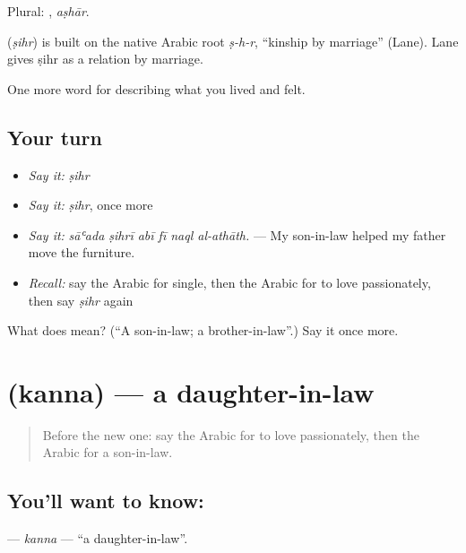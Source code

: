 Plural: , \emph{aṣhār}.

\begin{cousinweb}
\textbf{} (\emph{ṣihr}) is built on the native Arabic root \emph{ṣ-h-r}, \textquotedblleft{}kinship by marriage\textquotedblright{} (Lane). Lane gives ṣihr as a relation by marriage.
\end{cousinweb}

\begin{grammarlens}[title={What you've built}]
One more word for describing what you lived and felt.
\end{grammarlens}

\subsection*{Your turn}
\begin{itemize}
\raggedright
  \item \emph{Say it:} \emph{ṣihr}
  \item \emph{Say it:} \emph{ṣihr}, once more
  \item \emph{Say it:} \emph{sāʿada ṣihrī abī fī naql al-athāth.} — My son-in-law helped my father move the furniture.
  \item \emph{Recall:} say the Arabic for single, then the Arabic for to love passionately, then say \emph{ṣihr} again
\end{itemize}

\begin{tcolorbox}[breakable,colback=teal!4,colframe=teal!35!black,title={Before you move on}]
What does  mean? (\textquotedblleft{}A son-in-law; a brother-in-law\textquotedblright{}.) Say it once more.
\end{tcolorbox}
\section[\texorpdfstring{\ar{كنة} (kanna)}{كنة (kanna)}]{ (kanna) — a daughter-in-law}

\label{lesson:AR-C529-kanna}



\begin{quote}
Before the new one: say the Arabic for to love passionately, then the Arabic for a son-in-law.
\end{quote}

\subsection*{You'll want to know: }
\textbf{} — \emph{kanna} — \textquotedblleft{}a daughter-in-law\textquotedblright{}.

